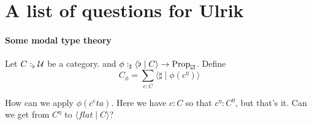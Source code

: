 \documentclass{article}
\begin{document}
\section{A list of questions for Ulrik}

\paragraph{Some modal type theory}

Let $C :_\flat \mathcal{U}$ be a category.
and $\phi :_\sharp \langle \flat \mid C \rangle \to \mathrm{Prop}_{\boxslash}$.
Define 
\[ C_\phi = \sum_{c : C} \langle \sharp \mid \phi(c^\eta) \rangle \]  

How can we apply $\phi(c^eta)$. Here we have $c : C$ so that $c^\eta : C^\eta$, 
but that's it. 
Can we get from $C^\eta$ to $\langle flat \mid C \rangle$?
\end{document}
